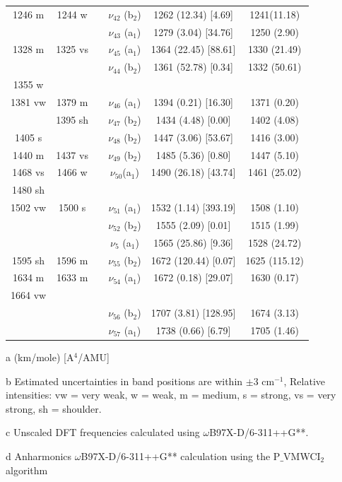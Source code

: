 \begin{table}[H]
\begin{center}
\begin{threeparttable}
\begin{tabular}{c c c c c c}
1246 m & 1244 w&  & \multicolumn{1}{c}{$\nu_{42}$ (b$_{2}$)} & 1262 (12.34) [4.69]&   1241(11.18)	\\ 
&  &  &  $\nu_{43}$ (a$_{1}$) & 1279 (3.04) [34.76] & 1250 (2.90) \\ 
1328 m & 1325 vs&  & $\nu_{45}$ (a$_{1}$)& 1364 (22.45) [88.61] &1330 (21.49) \\ 
&  &  & $\nu_{44}$ (b$_{2}$)& 1361 (52.78) [0.34] & 1332 (50.61) \\ 
1355 w &  &  & \multicolumn{1}{c}{} &  &  \\ 
1381 vw & 1379 m&  &  $\nu_{46}$ (a$_{1}$)& 1394 (0.21) [16.30] & 1371 (0.20)	\\ 
& 1395 sh &  & $\nu_{47}$ (b$_{2}$) & 1434 (4.48) [0.00] & \multicolumn{1}{c}{ 1402 (4.08)} \\ 
1405 s &  &  & $\nu_{48}$ (b$_{2}$) & 1447 (3.06) [53.67] & 1416 (3.00) \\ 
1440 m & 1437 vs
&  & \multicolumn{1}{c}{$\nu_{49}$ (b$_{2}$)} & 1485 (5.36) [0.80] & 1447 (5.10) \\ 
1468 vs & 1466 w&  & $\nu_{50}$(a$_{1}$)& 1490 (26.18) [43.74] &  1461 (25.02) \\ 
1480 sh &  &  &  &  &  \\ 
1502 vw & 1500 s&  & $\nu_{51}$ (a$_{1}$)& 1532 (1.14) [393.19] & 1508 (1.10) \\ 
&  &  &  $\nu_{52}$ (b$_{2}$) & 1555 (2.09) [0.01] & 1515 (1.99) \\ 
& \multicolumn{1}{l}{} && $\nu_{5}$ (a$_{1}$)
& 1565 (25.86) [9.36] &  1528 (24.72) \\ 
1595 sh & 1596 m&  & $\nu_{55}$ (b$_{2}$) & 	1672 (120.44) [0.07] &	1625 (115.12) \\ 
1634 m & 1633 m	&  & $\nu_{54}$ (a$_{1}$)	& 1672 (0.18) [29.07] & 1630 (0.17)	\\ 
1664 vw & \multicolumn{1}{l}{} &  &  &  &  \\
&  &  & $\nu_{56}$ (b$_{2}$) & 1707 (3.81) [128.95] & 1674 (3.13) \\ 
&  &  &$\nu_{57}$ (a$_{1}$)& 1738 (0.66) [6.79] & 1705 (1.46) \\
			\bottomrule
		
	\end{tabular}
	
	\begin{tablenotes}
		\item[a] (km/mole) [A$^{4}$/AMU]
		\item[b] Estimated uncertainties in band positions are within $\pm$3 cm$^{-1}$, Relative intensities: vw = very weak, w = weak, m = medium, s = strong, vs = very strong, sh = shoulder.
		\item[c] Unscaled DFT frequencies calculated using $\omega$B97X-D/6-311++G**.
		\item[d] Anharmonics $\omega$B97X-D/6-311++G** calculation using the P$\_$VMWCI$_{2}$ algorithm
	\end{tablenotes}
\end{threeparttable}
\end{center}
\label{freq-45-imino}
\end{table}
	
